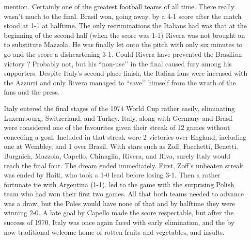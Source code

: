 mention. Certainly one of the greatest football teams of all time. There really
wasn't much to the final. Brasil won, going away, by a 4-1 score after the 
match stood at 1-1 at halftime. The only recriminations the Italians had was 
that at the beginning of the second half (when the score was 1-1) Rivera was 
not brought on to substitute Mazzola. He was finally let onto the pitch with 
only six minutes to go and the score a disheartening 3-1. Could Rivera have 
prevented the Brasilian victory ? Probably not, but his ``non-use’’ in the final 
caused fury among his supporters. Despite Italy's second place finish, the 
Italian fans were incensed with the Azzurri and only Rivera managed to ``save’’ 
himself from the wrath of the fans and the press.

Italy entered the final stages of the 1974 World Cup rather easily, eliminating
Luxembourg, Switzerland, and Turkey. Italy, along with Germany and Brasil were 
considered one of the favourites given their streak of 12 games without 
conceding a goal. Included in that streak were 2 victories over England, 
including one at Wembley, and 1 over Brasil. With stars such as Zoff, 
Facchetti, Benetti, Burgnich, Mazzola, Capello, Chinaglia, Rivera, and Riva, 
surely Italy would reach the final four. The dream ended immediately. First, 
Zoff's unbeaten streak was ended by Haiti, who took a 1-0 lead before losing 
3-1. Then a rather fortunate tie with Argentina (1-1), led to the game with the
surprising Polish team who had won their first two games. All that both teams 
needed to advance was a draw, but the Poles would have none of that and by 
halftime they were winning 2-0. A late goal by Capello made the score 
respectable, but after the success of 1970, Italy was once again faced with 
early elimination, and the by now traditional welcome home of rotten fruits and 
vegetables, and insults.

